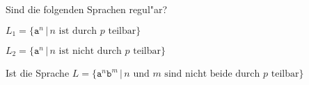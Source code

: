 Sind die folgenden Sprachen regul"ar?
\begin{teilaufgaben}
\item $L_1=\{ \texttt{a}^n\,|\, \text{$n$ ist durch $p$ teilbar}\}$
\item $L_2=\{ \texttt{a}^n\,|\, \text{$n$ ist nicht durch $p$ teilbar}\}$
\item Ist die Sprache $L=\{\texttt{a}^n\texttt{b}^m\,|\,\text{$n$ und $m$ sind nicht beide durch $p$ teilbar}\}$
\end{teilaufgaben}

\begin{loesung}
\end{loesung}

